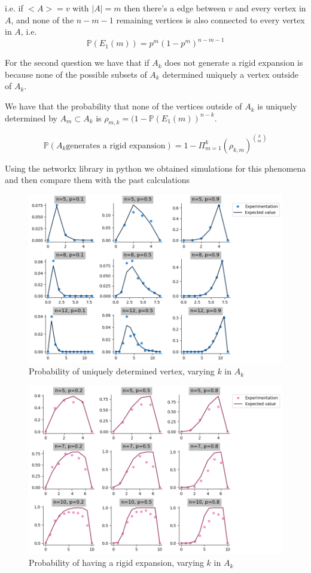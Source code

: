 \documentclass[a4paper]{tufte-handout}
\renewcommand{\P}{\mathbb{P}}
\begin{document}
i.e. if $<A> = v$ with $|A| = m$ then there's a edge between $v$ and every vertex in $A$, and none of the $n-m-1$ remaining vertices is also connected to every vertex in $A$, i.e.
$$\P(E_1(m)) = p^{m}(1-p^{m})^{n-m-1}$$

For the second question we have that if $A_k$ does not generate a rigid expansion is because none of the possible subsets of $A_k$ determined uniquely a vertex outside of $A_k$. 

We have that the probability that none of the vertices outside of $A_k$ is uniquely determined by $A_m\subset A_k$ is $\rho_{m,k} = (1 -  \P(E_1(m) )^{n-k}$.

$$\P(A_k \text{generates a rigid expansion}) = 1 -  \Pi_{m=1}^{k} (\rho_{k,m})^{\binom{k}{m}}  $$

Using the networkx library in python we obtained simulations for this phenomena and then compare them with the past calculations

\begin{figure}[h!]
	\centering
	\includegraphics[scale=0.5]{figures/fixed-uniq-det.png}
	\caption{Probability of uniquely determined vertex, varying $k$ in $A_k$}
\end{figure}

\begin{figure}[h!]
	\centering
	\includegraphics[scale=0.5]{figures/rig-prob.png}
	\caption{Probability of having a rigid expansion,  varying $k$ in $A_k$}
\end{figure}


\end{document}
